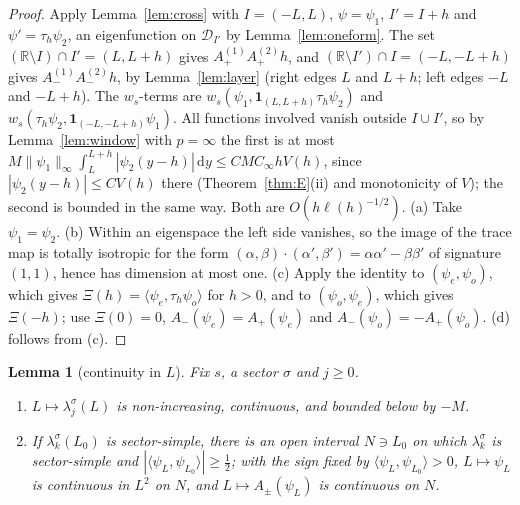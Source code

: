 \documentclass[11pt]{amsart}
\newcommand{\R}{\mathbb{R}}
\newcommand{\one}{\mathbf{1}}
\newcommand{\dd}{\,\mathrm{d}}
\newtheorem{lemma}[theorem]{Lemma}
\theoremstyle{definition}
\theoremstyle{remark}
\numberwithin{equation}{section}
\begin{document}
\begin{proof}
Apply Lemma~\ref{lem:cross} with $I=(-L,L)$, $\psi=\psi_1$, $I'=I+h$ and $\psi'=\tau_h\psi_2$, an eigenfunction on $\mathcal D_{I'}$ by Lemma~\ref{lem:oneform}. The set $(\R\setminus I)\cap I'=(L,L+h)$ gives $A_+^{(1)}A_+^{(2)}h$, and $(\R\setminus I')\cap I=(-L,-L+h)$ gives $A_-^{(1)}A_-^{(2)}h$, by Lemma~\ref{lem:layer} (right edges $L$ and $L+h$; left edges $-L$ and $-L+h$). The $w_s$-terms are $w_s(\psi_1,\one_{(L,L+h)}\tau_h\psi_2)$ and $w_s(\tau_h\psi_2,\one_{(-L,-L+h)}\psi_1)$. All functions involved vanish outside $I\cup I'$, so by Lemma~\ref{lem:window} with $p=\infty$ the first is at most $M\|\psi_1\|_\infty\int_L^{L+h}|\psi_2(y-h)|\dd y\le CMC_\infty hV(h)$, since $|\psi_2(y-h)|\le CV(h)$ there (Theorem~\ref{thm:E}(ii) and monotonicity of $V$); the second is bounded in the same way. Both are $O(h\ell(h)^{-1/2})$. (a) Take $\psi_1=\psi_2$. (b) Within an eigenspace the left side vanishes, so the image of the trace map is totally isotropic for the form $(\alpha,\beta)\cdot(\alpha',\beta')=\alpha\alpha'-\beta\beta'$ of signature $(1,1)$, hence has dimension at most one. (c) Apply the identity to $(\psi_e,\psi_o)$, which gives $\Xi(h)=\langle\psi_e,\tau_h\psi_o\rangle$ for $h>0$, and to $(\psi_o,\psi_e)$, which gives $\Xi(-h)$; use $\Xi(0)=0$, $A_-(\psi_e)=A_+(\psi_e)$ and $A_-(\psi_o)=-A_+(\psi_o)$. (d) follows from (c).
\end{proof}

\begin{lemma}[continuity in $L$]\label{lem:cont}
Fix $s$, a sector $\sigma$ and $j\ge0$.
\begin{enumerate}
\item[(a)] $L\mapsto\lambda^\sigma_j(L)$ is non-increasing, continuous, and bounded below by $-M$.
\item[(b)] If $\lambda^\sigma_k(L_0)$ is sector-simple, there is an open interval $N\ni L_0$ on which $\lambda^\sigma_k$ is sector-simple and $|\langle\psi_L,\psi_{L_0}\rangle|\ge\frac12$; with the sign fixed by $\langle\psi_L,\psi_{L_0}\rangle>0$, $L\mapsto\psi_L$ is continuous in $L^2$ on $N$, and $L\mapsto A_\pm(\psi_L)$ is continuous on $N$.
\end{enumerate}
\end{lemma}
\end{document}
